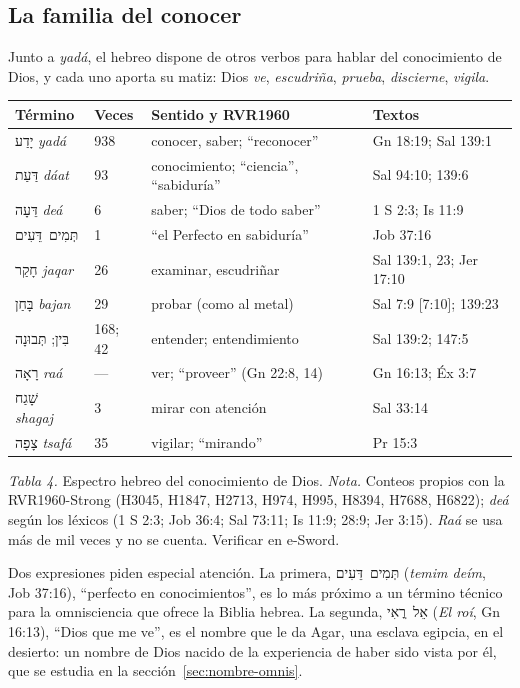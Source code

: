 \documentclass[11pt,letterpaper]{article}
\newcommand{\heb}[1]{\mbox{\foreignlanguage{hebrew}{#1}}}
\begin{document}
\subsection{La familia del conocer}
Junto a \emph{yadá}, el hebreo dispone de otros verbos para hablar del conocimiento de Dios, y cada uno aporta su matiz: Dios \emph{ve}, \emph{escudriña}, \emph{prueba}, \emph{discierne}, \emph{vigila}.

\begin{center}\small\renewcommand{\arraystretch}{1.2}
\begin{tabular}{@{}L{3.2cm}L{1.1cm}L{6.0cm}L{4.1cm}@{}}
\toprule
\textbf{Término} & \textbf{Veces} & \textbf{Sentido y RVR1960} & \textbf{Textos} \\ \midrule
\heb{יָדַע} \emph{yadá} & 938 & conocer, saber; ``reconocer'' & Gn 18:19; Sal 139:1 \\
\heb{דַּעַת} \emph{dáat} & 93 & conocimiento; ``ciencia'', ``sabiduría'' & Sal 94:10; 139:6 \\
\heb{דֵּעָה} \emph{deá} & 6 & saber; ``Dios de todo saber'' & 1 S 2:3; Is 11:9 \\
\heb{תְּמִים דֵּעִים} & 1 & ``el Perfecto en sabiduría'' & Job 37:16 \\
\heb{חָקַר} \emph{jaqar} & 26 & examinar, escudriñar & Sal 139:1, 23; Jer 17:10 \\
\heb{בָּחַן} \emph{bajan} & 29 & probar (como al metal) & Sal 7:9 [7:10]; 139:23 \\
\heb{בִּין}; \heb{תְּבוּנָה} & 168; 42 & entender; entendimiento & Sal 139:2; 147:5 \\
\heb{רָאָה} \emph{raá} & --- & ver; ``proveer'' (Gn 22:8, 14) & Gn 16:13; Éx 3:7 \\
\heb{שָׁגַח} \emph{shagaj} & 3 & mirar con atención & Sal 33:14 \\
\heb{צָפָה} \emph{tsafá} & 35 & vigilar; ``mirando'' & Pr 15:3 \\
\bottomrule
\end{tabular}\par
{\footnotesize\color{gris}\textit{Tabla 4.} Espectro hebreo del conocimiento de Dios. \textit{Nota.} Conteos propios con la RVR1960-Strong (H3045, H1847, H2713, H974, H995, H8394, H7688, H6822); \emph{deá} según los léxicos (1 S 2:3; Job 36:4; Sal 73:11; Is 11:9; 28:9; Jer 3:15). \emph{Raá} se usa más de mil veces y no se cuenta. Verificar en e-Sword.}
\end{center}

Dos expresiones piden especial atención. La primera, \heb{תְּמִים דֵּעִים} (\emph{temim deím}, Job 37:16), ``perfecto en conocimientos'', es lo más próximo a un término técnico para la omnisciencia que ofrece la Biblia hebrea. La segunda, \heb{אֵל רֳאִי} (\emph{El roí}, Gn 16:13), ``Dios que me ve'', es el nombre que le da Agar, una esclava egipcia, en el desierto: un nombre de Dios nacido de la experiencia de haber sido vista por él, que se estudia en la sección~\ref{sec:nombre-omnis}.
\end{document}
